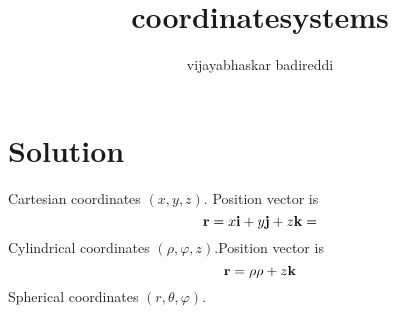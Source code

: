 \documentclass[12pt]{article}
\title{coordinatesystems}
\author{vijayabhaskar badireddi}
\date{}
\begin{document}

\section*{Solution}
Cartesian coordinates $(x,y,z)$. Position vector is \[\vb{r}=x\vb{i}+y\vb{j}+z\vb{k}=\]
Cylindrical coordinates $(\rho,\varphi,z)$.Position vector is \[\vb{r}=\rho\vb{\rho}+z\vb{k}\]
Spherical coordinates $(r,\theta,\varphi)$.
\end{document}
